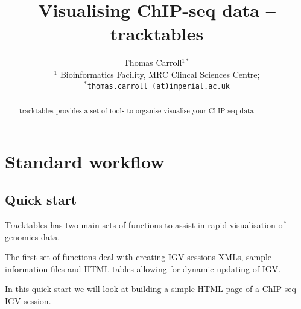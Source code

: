 \documentclass[12pt]{article}\usepackage[]{graphicx}\usepackage[usenames,dvipsnames]{color}
\author{Thomas Carroll$^{1*}$\\[1em] \small{$^{1}$ Bioinformatics Facility, MRC Clincal Sciences Centre;} \\ \small{\texttt{$^*$thomas.carroll (at)imperial.ac.uk}}}
\title{Visualising ChIP-seq data -- tracktables}
\begin{document}
\maketitle

\begin{abstract}
 
 tracktables provides a set of tools to organise visualise your ChIP-seq data.
  \vspace{1em}
  
  \end{abstract}



\newpage

\tableofcontents

\section{Standard workflow}

\subsection{Quick start}

Tracktables has two main sets of functions to assist in rapid visualisation of genomics data. 

The first set of functions deal with creating IGV sessions XMLs, sample information files and HTML tables allowing for dynamic updating of IGV.

In this quick start we will look at building a simple HTML page of a ChIP-seq IGV session.
\end{document}
